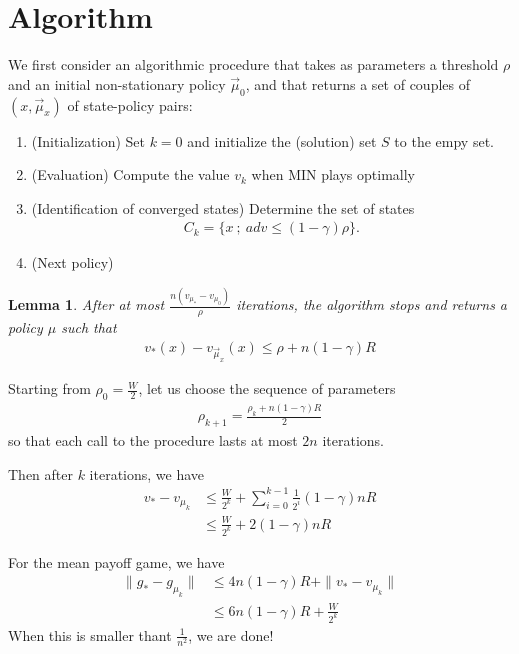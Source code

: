 \documentclass{article}
\newtheorem{lemma}{Lemma}
\begin{document}
\section{Algorithm}

We first consider an algorithmic procedure that takes as parameters a threshold $\rho$ and an initial non-stationary policy $\vec\mu_0$, and that returns a set of couples of $(x,\vec\mu_x)$ of state-policy pairs:
  \begin{enumerate}
    \item (Initialization) Set $k=0$ and initialize the (solution) set $S$ to the empy set.
    \item (Evaluation) Compute the value $v_k$ when MIN plays optimally 
    \item (Identification of converged states) Determine the set of states
      \begin{align}
        C_k = \{ x ~;~ adv \le (1-\gamma)\rho \}.
      \end{align}
     \item (Next policy)
  \end{enumerate}
  
  \begin{lemma}
    After at most $\frac{n (v_{\mu_*}-v_{\mu_0})}{\rho}$ iterations, the algorithm stops and returns a policy $\mu$ such that
    \begin{align}
      v_*(x) - v_{\vec\mu_x}(x) \le \rho + n(1-\gamma) R 
    \end{align}
  \end{lemma}

  
  Starting from $\rho_0=\frac{W}{2}$, let us choose the sequence of parameters
  \begin{align}
    \rho_{k+1} = \frac{\rho_k+n(1-\gamma) R}{2}
  \end{align}
  so that each call to the procedure lasts at most $2n$ iterations.

  Then after $k$ iterations, we have
  \begin{align}
    v_* - v_{\mu_k} &\le \frac{W}{2^k} + \sum_{i=0}^{k-1} \frac{1}{2^i}(1-\gamma)n R \\
    &\le \frac{W}{2^k} + 2(1-\gamma)n R
  \end{align}
  
  For the mean payoff game, we have
  \begin{align}
    \| g_* - g_{\mu_k} \| & \le 4n(1-\gamma)R + \|v_*-v_{\mu_k}\| \\
    & \le 6n(1-\gamma)R + \frac{W}{2^k}
  \end{align}
  When this is smaller thant $\frac{1}{n^2}$, we are done!
    
 





\end{document}
